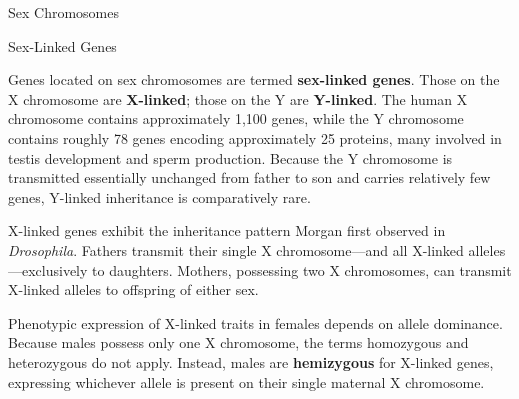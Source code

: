 \documentclass[10pt]{article}
\begin{document}
    \begin{core}[label=core:sex_chromosomes]{Sex Chromosomes}


    \end{core}    

    \begin{core}{Sex-Linked Genes}

      Genes located on sex chromosomes are termed \textbf{sex-linked genes}. Those on the X chromosome are \textbf{X-linked}; those on the Y are \textbf{Y-linked}. The human X chromosome contains approximately 1,100 genes, while the Y chromosome contains roughly 78 genes encoding approximately 25 proteins, many involved in testis development and sperm production. Because the Y chromosome is transmitted essentially unchanged from father to son and carries relatively few genes, Y-linked inheritance is comparatively rare.


      X-linked genes exhibit the inheritance pattern Morgan first observed in \textit{Drosophila}. Fathers transmit their single X chromosome---and all X-linked alleles---exclusively to daughters. Mothers, possessing two X chromosomes, can transmit X-linked alleles to offspring of either sex.

      Phenotypic expression of X-linked traits in females depends on allele dominance. Because males possess only one X chromosome, the terms homozygous and heterozygous do not apply. Instead, males are \textbf{hemizygous} for X-linked genes, expressing whichever allele is present on their single maternal X chromosome.

    \end{core}
\end{document}

